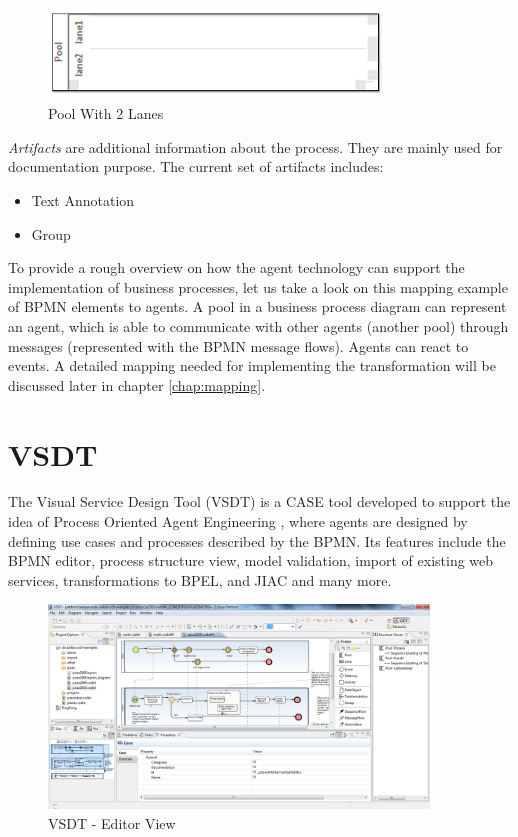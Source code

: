 \begin{figure}[htbp]
	\centering
		\includegraphics[width = 0.8\textwidth]{images/swimlane.png}
	\caption{Pool With 2 Lanes}
	\label{fig:swimlane}
\end{figure}

\textit{Artifacts} are additional information about the process. They are mainly used for documentation purpose. The current set of artifacts includes:
\begin{itemize}
	\item Text Annotation
	\item Group
\end{itemize}


To provide a rough overview on how the agent technology can support the implementation of business processes, let us take a look on this mapping example of BPMN elements to agents. A pool in a business process diagram can represent an agent, which is able to communicate with other agents (another pool) through messages (represented with the BPMN message flows). Agents can react to events. A detailed mapping needed for implementing the transformation will be discussed later in chapter \ref{chap:mapping}.
\section{VSDT}
\label{sec:vsdt}
The Visual Service Design Tool (VSDT) \cite{VSDTWEB} is a CASE tool developed to support the idea of Process Oriented Agent Engineering \cite{TKMLAH2010}, where agents are designed by defining use cases and processes described by the BPMN. Its features include the BPMN editor, process structure view, model validation, import of existing web services, transformations to BPEL, and JIAC and many more. 
\begin{figure}[h]
	\centering
		\includegraphics[width=0.90\textwidth]{images/vsdt_snapshot.png}
	\caption{VSDT - Editor View}
	\label{fig:VSDT}
\end{figure}

